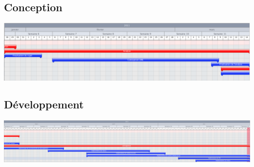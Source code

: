 	\subsection*{Conception}
		\begin{center}
			\includegraphics[width=20cm, angle=90]{./Organisation/Img/BomberBlok-Conception.eps}
		\end{center}
	
	\subsection*{Développement}
		\begin{center}
			\includegraphics[width=20cm, angle=90]{./Organisation/Img/BomberBlok-Developpement.eps}
		\end{center}